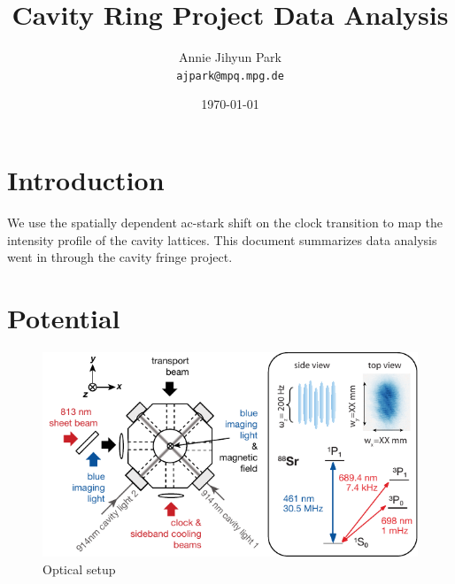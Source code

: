 \documentclass[bibnotes]{article}
\title{Cavity Ring Project Data Analysis} %
\author{Annie Jihyun Park\\ \texttt{ajpark@mpq.mpg.de}} %
\date{\today} %
\begin{document}
\maketitle %


\section*{Introduction} %

	We use the spatially dependent ac-stark shift on the clock transition to map the intensity profile of the cavity lattices. This document summarizes data analysis went in through the cavity fringe project. 
\tableofcontents

\section{Potential}

	\begin{figure}[h]
	    \centering
	    \includegraphics[]{figures/setup.pdf}
	    \caption{Optical setup}
	    \label{fig:setup}
	\end{figure}
\end{document}
